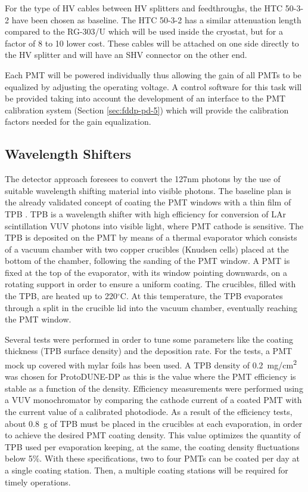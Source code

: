 For the type of HV cables between HV splitters and feedthroughs, the HTC 50-3-2 \cite{htc-50-3-2} have been chosen as baseline. The HTC 50-3-2 has a similar attenuation length compared to the RG-303/U \cite{rg303} which will be used inside the cryostat, but for a factor of \num{8} to \num{10} lower cost. These cables will be attached on one side directly to the HV splitter and will have an SHV connector on the other end.

Each PMT will be powered individually thus allowing the gain of all PMTs to be equalized by adjusting the operating voltage. A control software for this task will be provided taking into account the development of an interface to the PMT calibration system (Section \ref{sec:fddp-pd-5}) which will provide the calibration factors needed for the gain equalization.

\subsection{Wavelength Shifters}
\label{sec:fddp-pd-2.4}

The detector approach foresees to convert the \si{127}{nm} photons by the use of suitable wavelength shifting material into visible photons. The baseline plan is the already validated concept of coating the PMT windows with a thin film of TPB \cite{tpb}. TPB is a wavelength shifter with high efficiency for conversion of LAr scintillation VUV photons into visible light, where PMT cathode is sensitive. The TPB is deposited on the PMT by means of a thermal evaporator which consists of a vacuum chamber with two copper crucibles (Knudsen cells) placed at the bottom of the chamber, following the sanding of the PMT window. A PMT is fixed at the top of the evaporator, with its window pointing downwards, on a rotating support in order to ensure a uniform coating. The crucibles, filled with the TPB, are heated up to \si{220}{$^\circ$C}. At this temperature, the TPB evaporates through a split in the crucible lid into the vacuum chamber, eventually reaching the PMT window.

Several tests were performed in order to tune some parameters like the coating thickness (TPB surface density) and the deposition rate. For the tests, a PMT mock up covered with mylar foils has been used. A TPB density of \SI{0.2}{mg/cm^2} was chosen for ProtoDUNE-DP as this is the value where the PMT efficiency is stable as a function of the density. Efficiency measurements were performed using a VUV monochromator by comparing the cathode current of a coated PMT with the current value of a calibrated photodiode. As a result of the efficiency tests, about \SI{0.8}{g} of TPB must be placed in the crucibles at each evaporation, in order to achieve the desired PMT coating density. %
This value optimizes the quantity of TPB used per evaporation keeping, at the same, the coating density fluctuations below \num{5}$\%$. With these specifications, two to four PMTs can be coated per day at a single coating station. Then, a multiple coating stations will be required for timely operations.


